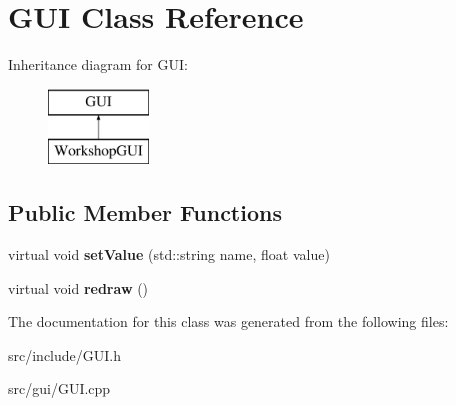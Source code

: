 \hypertarget{classGUI}{\section{G\-U\-I Class Reference}
\label{classGUI}
}
Inheritance diagram for G\-U\-I\-:\begin{figure}[H]
\begin{center}
\leavevmode
\includegraphics[height=2.000000cm]{classGUI}
\end{center}
\end{figure}
\subsection*{Public Member Functions}
\begin{DoxyCompactItemize}
\item 
\hypertarget{classGUI_ac7565b952201756e1dc1f0b9486f6b28}{virtual void {\bfseries set\-Value} (std\-::string name, float value)}\label{classGUI_ac7565b952201756e1dc1f0b9486f6b28}

\item 
\hypertarget{classGUI_a86c7f4b8bd81b4c0e191b40a134e2f9e}{virtual void {\bfseries redraw} ()}\label{classGUI_a86c7f4b8bd81b4c0e191b40a134e2f9e}

\end{DoxyCompactItemize}


The documentation for this class was generated from the following files\-:\begin{DoxyCompactItemize}
\item 
src/include/G\-U\-I.\-h\item 
src/gui/G\-U\-I.\-cpp\end{DoxyCompactItemize}
